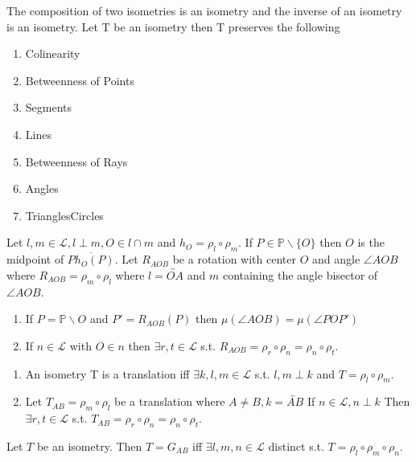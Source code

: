 \documentclass[12pt]{article}
\theoremstyle{lowspace}
\newenvironment{customthm}[1]
  {\renewcommand\theinnercustomthm{#1}\innercustomthm}
  {\endinnercustomthm}
\theoremstyle{lowspace}
\theoremstyle{lowspace}
\begin{document}
    \begin{customthm}{10.1.6}
      The composition of two isometries is an isometry and the inverse of an isometry is an isometry.
    \end{customthm}
    \begin{customthm}{10.1.7 (Properties of Isometries)}
      Let T be an isometry then T preserves the following
      \begin{enumerate}
        \item Colinearity
        \item Betweenness of Points
        \item Segments
        \item Lines
        \item Betweenness of Rays
        \item Angles
        \item TrianglesCircles
      \end{enumerate}
    \end{customthm}
    \begin{customthm}{10.2.2 ($\frac{1}{2}$-turn theorem)}
      Let $l,m \in \mathscr{L}, l \perp m, O \in l \cap m$ and $h_O = \rho_l \circ \rho_m$. If $P \in \mathbb{P}\backslash\{O\}$ then $O$ is 
      the midpoint of $\overline{Ph_O(P)}$.
    \end{customthm}
    \begin{customthm}{10.2.5 (The Rotation Theorem)}
      Let $R_{AOB}$ be a rotation with center $O$ and angle $\angle AOB$ where $R_{AOB} = \rho_m \circ \rho_l$ where $l = \overleftrightarrow{OA}$ and
      $m$ containing the angle bisector of $\angle AOB$.
      \begin{enumerate}
        \item If $P = \mathbb{P}\backslash {O}$ and $P' = R_{AOB}(P)$ then $\mu(\angle AOB) = \mu(\angle POP')$
        \item If $n \in \mathscr{L}$ with $O \in n$ then $\exists r,t \in \mathscr{L}$ s.t. $R_{AOB}=\rho_r \circ \rho_n = \rho_n \circ \rho_t$.
      \end{enumerate} 
    \end{customthm}
    \begin{customthm}{10.2.8 (Translation Theorem)}
      \begin{enumerate}
        \item An isometry T is a translation iff $\exists k,l,m \in \mathscr{L}$ s.t. $l,m \perp k$ and $T=\rho_l \circ \rho_m$.
        \item Let $T_{AB}=\rho_m \circ \rho_l$ be a translation where $A\neq B, k = \overleftrightarrow{AB}$ If $n \in \mathscr{L}, n \perp k$ Then
        $\exists r,t \in \mathscr{L}$ s.t. $T_{AB}=\rho_r \circ \rho_n=\rho_n \circ \rho_t$.
      \end{enumerate}
    \end{customthm}
    \begin{customthm}{10.3.2 (Glide Reflection Theorem)}
      Let $T$ be an isometry. Then $T=G_{AB}$ iff $\exists l,m,n \in \mathscr{L}$ distinct s.t. $T = \rho_l \circ \rho_m \circ \rho_n$.
    \end{customthm}
\end{document}
